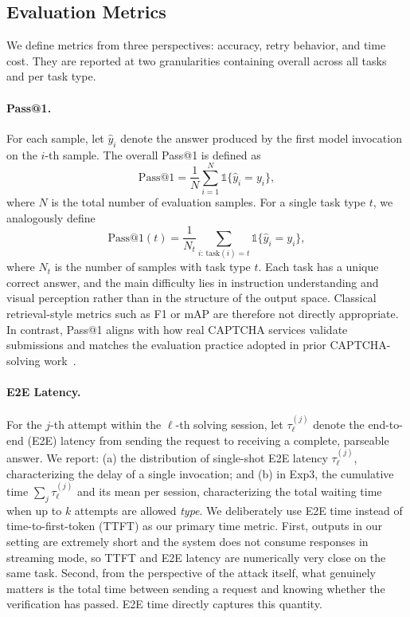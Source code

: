 \documentclass[sigconf, review]{acmart}
\begin{document}
\subsection{Evaluation Metrics}

We define metrics from three perspectives: accuracy, retry behavior, and time cost. They are reported at two granularities containing overall across all tasks and per task type.

\paragraph{Pass@1.}
For each sample, let $\hat{y}_i$ denote the answer produced by the first model invocation on the $i$-th sample. The overall Pass@1 is defined as
\begin{equation}
  \mathrm{Pass@1} = \frac{1}{N}\sum_{i=1}^{N} \mathbb{1}\{\hat{y}_i = y_i\},
\end{equation}
where $N$ is the total number of evaluation samples. For a single task type $t$, we analogously define
\begin{equation}
  \mathrm{Pass@1}(t) = \frac{1}{N_t}\sum_{i: \, \mathrm{task}(i) = t} \mathbb{1}\{\hat{y}_i = y_i\},
\end{equation}
where $N_t$ is the number of samples with task type $t$. Each task has a unique correct answer, and the main difficulty lies in instruction understanding and visual perception rather than in the structure of the output space. Classical retrieval-style metrics such as F1 or mAP are therefore not directly appropriate. In contrast, Pass@1 aligns with how real CAPTCHA services validate submissions and matches the evaluation practice adopted in prior CAPTCHA-solving work~\cite{todo}. %

\paragraph{E2E Latency.} For the $j$-th attempt within the $\ell$-th solving session, let $\tau_\ell^{(j)}$ denote the end-to-end (E2E) latency from sending the request to receiving a complete, parseable answer. We report: (a) the distribution of single-shot E2E latency $\tau_\ell^{(j)}$, characterizing the delay of a single invocation; and (b) in Exp3, the cumulative time $\sum_j \tau_\ell^{(j)}$ and its mean per session, characterizing the total waiting time when up to $k$ attempts are allowed \emph{type}. We deliberately use E2E time instead of time-to-first-token (TTFT) as our primary time metric. First, outputs in our setting are extremely short and the system does not consume responses in streaming mode, so TTFT and E2E latency are numerically very close on the same task. Second, from the perspective of the attack itself, what genuinely matters is the total time between sending a request and knowing whether the verification has passed. E2E time directly captures this quantity.
\end{document}
